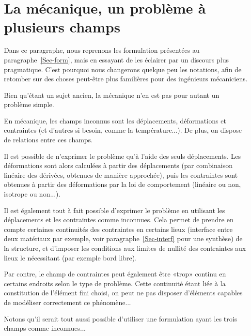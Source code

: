 \medskip
\section{La mécanique, un problème à plusieurs champs}\label{Sec-champs}

Dans ce paragraphe, nous reprenons les formulation présentées au paragraphe~\ref{Sec-form}, mais en essayant de les éclairer par un discours plus pragmatique. C'est pourquoi nous changerons quelque peu les notations, afin de retomber sur des choses peut-être plus familières pour des ingénieurs mécaniciens.

\medskip
Bien qu'étant un sujet ancien, la mécanique n'en est pas pour autant un problème simple.

En mécanique, les champs inconnus sont les déplacements, déformations et contraintes (et d'autres si besoin, comme la température...). De plus, on dispose de relations entre ces champs.

\medskip
Il est possible de n'exprimer le problème qu'à l'aide des seuls déplacements. Les déformations sont alors calculées à partir des déplacements (par combinaison linéaire des dérivées, obtenues de manière approchée), puis les contraintes sont obtenues à partir des déformations par la loi de comportement (linéaire ou non, isotrope ou non...).

\medskip
Il est également tout à fait possible d'exprimer le problème en utilisant les déplacements et les contraintes comme inconnues. Cela permet de prendre en compte certaines continuités des contraintes en certains lieux (interface entre deux matériaux par exemple, voir paragraphe~\ref{Sec-interf} pour une synthèse) de la structure, et d'imposer les conditions aux limites de nullité des contraintes aux lieux le nécessitant (par exemple bord libre).

Par contre, le champ de contraintes peut également être «trop» continu en certains endroits selon le type de problème. Cette continuité étant liée à la constitution de l'élément fini choisi, on peut ne pas disposer d'éléments capables de modéliser correctement ce phénomène...

\medskip
Notons qu'il serait tout aussi possible d'utiliser une formulation ayant les trois champs comme inconnues...



